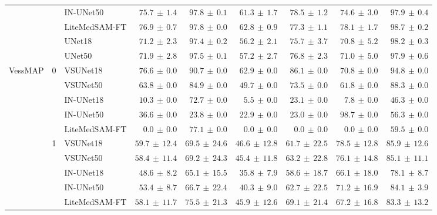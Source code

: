 \documentclass[%
reprint,
nofootinbib,
 amsmath,amssymb,
aps,
superscriptaddress,
showkeys,
longbibliography
]{revtex4-1}
\begin{document}
\begin{table}[t]
\begin{tabular}{l c l r r r r r r}
 &  & IN-UNet50 & $75.7 \,\pm\, 1.4$ & $97.8 \,\pm\, 0.1$ & $61.3 \,\pm\, 1.7$ & $78.5 \,\pm\, 1.2$ & $74.6 \,\pm\, 3.0$ & $97.9 \,\pm\, 0.4$ \\
 &  & LiteMedSAM-FT & $\mathbf{76.9} \,\pm\, 0.7$ & $97.8 \,\pm\, 0.0$ & $62.8 \,\pm\, 0.9$ & $77.3 \,\pm\, 1.1$ & $78.1 \,\pm\, 1.7$ & $98.7 \,\pm\, 0.2$ \\
 &  & UNet18 & $71.2 \,\pm\, 2.3$ & $97.4 \,\pm\, 0.2$ & $56.2 \,\pm\, 2.1$ & $75.7 \,\pm\, 3.7$ & $70.8 \,\pm\, 5.2$ & $98.2 \,\pm\, 0.3$ \\
 &  & UNet50 & $71.9 \,\pm\, 2.8$ & $97.5 \,\pm\, 0.1$ & $57.2 \,\pm\, 2.7$ & $76.8 \,\pm\, 2.3$ & $71.0 \,\pm\, 5.0$ & $97.9 \,\pm\, 0.6$ \\
\hline
\multirow{19}{*}{VessMAP} & \multirow{5}{*}{0} & VSUNet18 & $\mathbf{76.6} \,\pm\, 0.0$ & $90.7 \,\pm\, 0.0$ & $62.9 \,\pm\, 0.0$ & $86.1 \,\pm\, 0.0$ & $70.8 \,\pm\, 0.0$ & $94.8 \,\pm\, 0.0$ \\
 &  & VSUNet50 & $63.8 \,\pm\, 0.0$ & $84.9 \,\pm\, 0.0$ & $49.7 \,\pm\, 0.0$ & $73.5 \,\pm\, 0.0$ & $61.8 \,\pm\, 0.0$ & $88.3 \,\pm\, 0.0$ \\
 &  & IN-UNet18 & $10.3 \,\pm\, 0.0$ & $72.7 \,\pm\, 0.0$ & $5.5 \,\pm\, 0.0$ & $23.1 \,\pm\, 0.0$ & $7.8 \,\pm\, 0.0$ & $46.3 \,\pm\, 0.0$ \\
 &  & IN-UNet50 & $36.6 \,\pm\, 0.0$ & $23.8 \,\pm\, 0.0$ & $22.9 \,\pm\, 0.0$ & $23.0 \,\pm\, 0.0$ & $98.7 \,\pm\, 0.0$ & $56.3 \,\pm\, 0.0$ \\
 &  & LiteMedSAM-FT & $0.0 \,\pm\, 0.0$ & $77.1 \,\pm\, 0.0$ & $0.0 \,\pm\, 0.0$ & $0.0 \,\pm\, 0.0$ & $0.0 \,\pm\, 0.0$ & $59.5 \,\pm\, 0.0$ \\
\cline{2-9}
 & \multirow{7}{*}{1} & VSUNet18 & $\mathbf{59.7} \,\pm\, 12.4$ & $69.5 \,\pm\, 24.6$ & $46.6 \,\pm\, 12.8$ & $61.7 \,\pm\, 22.5$ & $78.5 \,\pm\, 12.8$ & $85.9 \,\pm\, 12.6$ \\
 &  & VSUNet50 & $58.4 \,\pm\, 11.4$ & $69.2 \,\pm\, 24.3$ & $45.4 \,\pm\, 11.8$ & $63.2 \,\pm\, 22.8$ & $76.1 \,\pm\, 14.8$ & $85.1 \,\pm\, 11.1$ \\
 &  & IN-UNet18 & $48.6 \,\pm\, 8.2$ & $65.1 \,\pm\, 15.5$ & $35.8 \,\pm\, 7.9$ & $58.6 \,\pm\, 18.7$ & $66.1 \,\pm\, 18.0$ & $78.1 \,\pm\, 8.7$ \\
 &  & IN-UNet50 & $53.4 \,\pm\, 8.7$ & $66.7 \,\pm\, 22.4$ & $40.3 \,\pm\, 9.0$ & $62.7 \,\pm\, 22.5$ & $71.2 \,\pm\, 16.9$ & $84.1 \,\pm\, 3.9$ \\
 &  & LiteMedSAM-FT & $58.1 \,\pm\, 11.7$ & $75.5 \,\pm\, 21.3$ & $45.9 \,\pm\, 12.6$ & $69.1 \,\pm\, 21.4$ & $67.2 \,\pm\, 16.8$ & $83.3 \,\pm\, 13.2$ \\

\end{tabular}
\end{table}
\end{document}

